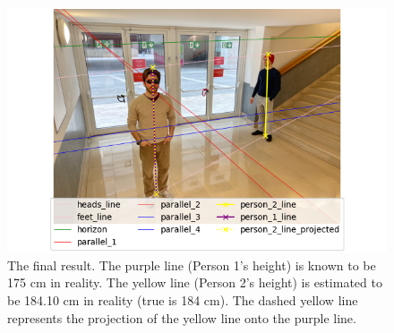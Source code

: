 \begin{figure}
    \centering
    \includegraphics[width=0.5\linewidth]{img/final.png}
    \caption{The final result. The purple line (Person 1's height) is known to be 175 cm in reality. The yellow line (Person 2's height) is estimated to be 184.10 cm in reality (true is 184 cm). The dashed yellow line represents the projection of the yellow line onto the purple line.}
    \label{fig:final}
\end{figure}